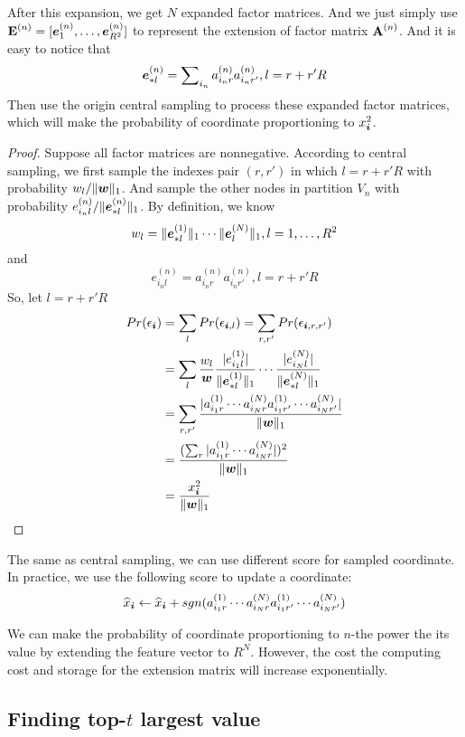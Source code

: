 \documentclass[letterpaper]{article}
\newcommand{\Sca}[3]{{#1}^{(#2)}_{i_#2#3}}%
\newcommand{\V}[1]{{\bm{{\MakeLowercase{#1}}}}}
\newcommand{\VnC}[3]{\V{#1}^{(#2)}_{#3}}
\newcommand{\M}[1]{{\bm{\mathbf{\MakeUppercase{#1}}}}}
\newcommand{\norm}[2]{\|#1\|_{#2}}
\begin{document}
After this expansion, we get $N$ expanded factor matrices. And we just simply use $\M{E}^{(n)}=[\VnC{e}{n}{1},\ldots,\VnC{e}{n}{R^2}]$ to represent the extension of factor matrix $\M{A}^{(n)}$. And it is easy to notice that
\[
\VnC{e}{n}{*l} = \sum\nolimits_{i_n}\Sca{a}{n}{r}\Sca{a}{n}{r'},l=r+r'R
\]
Then use the origin central  sampling to process these expanded factor matrices, which will make the probability of coordinate proportioning to $x_{\V{i}}^2$.
\begin{proof}
Suppose all factor matrices are nonnegative. According to central sampling, we first sample the indexes pair $(r,r')$ in which $l = r+r'R$ with probability $w_l/\norm{\V{w}}{1}$. And sample the other nodes in partition $V_n$ with probability $e^{(n)}_{i_nl}/\norm{\VnC{e}{n}{*l}}{1}$. By definition, we know
\[
w_l = \norm{\VnC{e}{1}{*l}}{1}\cdots \norm{\VnC{e}{N}{l}}{1}, l = 1,\ldots,R^2
\]
and
\[
e^{(n)}_{i_nl} = \Sca{a}{n}{r}\Sca{a}{n}{r'}, l = r+r'R
\]
So, let $l = r+r'R$
\begin{align*}
Pr(\epsilon_{\V{i}}) &= \sum_{l} Pr(\epsilon_{\V{i},l})= \sum_{r,r'} Pr(\epsilon_{\V{i},r,r'})\\
&= \sum_{l} \frac{w_l}{\V{w}}
\frac{|e^{(1)}_{i_1l}|}{\norm{\VnC{e}{1}{*l}}{1}}\cdots
\frac{|e^{(N)}_{i_Nl}|}{\norm{\VnC{e}{N}{*l}}{1}}\\
& = \sum_{r,r'} \frac{|\Sca{a}{1}{r}\cdots\Sca{a}{N}{r}\Sca{a}{1}{r'}\cdots\Sca{a}{N}{r'}|}
{\norm{\V{W}}{1}}\\
& = \frac{(\sum_{r}|\Sca{a}{1}{r}\cdots\Sca{a}{N}{r}|)^2}{\norm{\V{W}}{1}}\\
& = \frac{x_{\V{i}}^2}{\norm{\V{w}}{1}}
\end{align*}
\end{proof}

The same as central sampling, we can use different score for sampled coordinate. In practice, we use the following score to update a coordinate:
\[
\widehat{x}_{\V{i}} \leftarrow \widehat{x}_{\V{i}} +sgn(\Sca{a}{1}{r}\cdots\Sca{a}{N}{r}\Sca{a}{1}{r'}\cdots\Sca{a}{N}{r'})
\]

We can make the probability of coordinate proportioning to $n$-the power the its value by extending the feature vector to $R^N$. However, the cost the computing cost and storage for the extension matrix will increase exponentially.


\subsection{Finding top-$t$ largest value}
\end{document}
